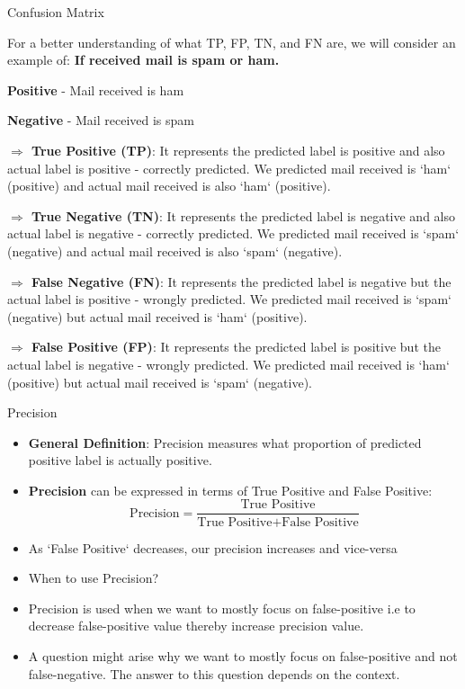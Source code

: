 \documentclass[11pt]{beamer}
\begin{document}
\begin{frame}{Confusion Matrix}
	\begin{itemize}
		\item \footnotesize{For a better understanding of what TP, FP, TN, and FN are, we will consider an example of:  \textbf{If received mail is spam or ham.}
		\item \textbf{Positive} - Mail received is ham
		\item \textbf{Negative} - Mail received is spam 
		\item \textbf{$\Rightarrow$   True Positive (TP)}: It represents the predicted label is positive and also actual label is positive - correctly predicted. We predicted mail received is `ham` (positive) and actual mail received is also `ham` (positive).
		\item \textbf{$\Rightarrow$   True Negative (TN)}: It represents the predicted label is negative and also actual label is negative - correctly predicted. We predicted mail received is `spam` (negative) and actual mail received is also `spam` (negative).
		\item \textbf{$\Rightarrow$   False Negative (FN)}: It represents the predicted label is negative but the actual label is positive - wrongly predicted. We predicted mail received is `spam` (negative) but actual mail received is `ham` (positive).
		\item \textbf{$\Rightarrow$   False Positive (FP)}: It represents the predicted label is positive but the actual label is negative - wrongly predicted. We predicted mail received is `ham` (positive) but actual mail received is `spam` (negative).}
	\end{itemize}
\end{frame}
\begin{frame}{Precision}
	\begin{itemize}
		\item \textbf{General Definition}: Precision measures what proportion of predicted positive label is actually positive.
		\item \textbf{Precision} can be expressed in terms of True Positive and False Positive: $$\text{Precision} = \frac{\text{True Positive}}{\text{True Positive}+\text{False Positive}}$$
		\item As `False Positive` decreases, our precision increases and vice-versa
		\item When to use Precision?
		\item Precision is used when we want to mostly focus on false-positive i.e to decrease false-positive value thereby increase precision value. 
		\item A question might arise why we want to mostly focus on false-positive and not false-negative. The answer to this question depends on the context.
	\end{itemize}
\end{frame}
\end{document}
